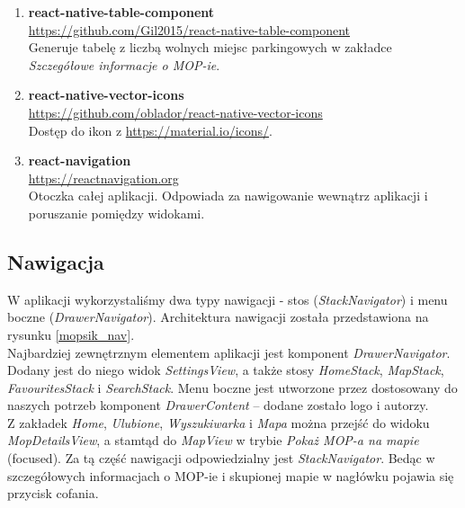 \begin{enumerate}
\item \textbf{react-native-table-component} \\
\url{https://github.com/Gil2015/react-native-table-component}\\
Generuje tabelę z liczbą wolnych miejsc parkingowych w zakładce \textit{Szczegółowe informacje o MOP-ie}.

\item \textbf{react-native-vector-icons} \\
\url{https://github.com/oblador/react-native-vector-icons}\\
Dostęp do ikon z \url{https://material.io/icons/}.

\item \textbf{react-navigation} \\
\url{https://reactnavigation.org}\\
Otoczka całej aplikacji. Odpowiada za nawigowanie wewnątrz aplikacji i poruszanie pomiędzy widokami.
\end{enumerate}

\subsection{Nawigacja}
W aplikacji wykorzystaliśmy dwa typy nawigacji - stos (\textit{StackNavigator}) i menu boczne (\textit{DrawerNavigator}). Architektura nawigacji została przedstawiona na rysunku \ref{mopsik_nav}.\\


Najbardziej zewnętrznym elementem aplikacji jest komponent \textit{DrawerNavigator}. Dodany jest do niego widok \textit{SettingsView}, a także stosy \textit{HomeStack}, \textit{MapStack}, \textit{FavouritesStack} i \textit{SearchStack}. Menu boczne jest utworzone przez dostosowany do naszych potrzeb komponent \textit{DrawerContent} -- dodane zostało logo i autorzy. \\

Z zakładek \textit{Home}, \textit{Ulubione}, \textit{Wyszukiwarka} i \textit{Mapa} można przejść do widoku \textit{MopDetailsView}, a stamtąd do \textit{MapView} w trybie \textit{Pokaż MOP-a na mapie} (focused). Za tą część nawigacji odpowiedzialny jest \textit{StackNavigator}. Bedąc w szczegółowych informacjach o MOP-ie i skupionej mapie w nagłówku pojawia się przycisk cofania.\\

